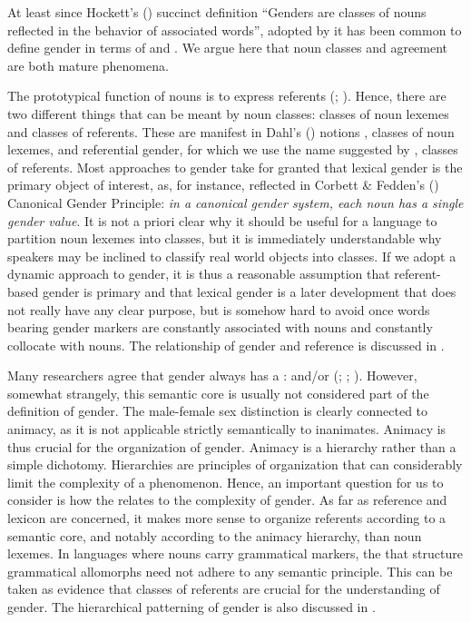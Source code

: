 \documentclass[output=collectionpaper]{langsci/langscibook}
\begin{document}
At least since Hockett's (\citeyear[231]{Hockett1958}) succinct definition \textendash{} ``Genders are classes of nouns reflected in the behavior of associated words'', adopted by \citet{Corbett1991} \textendash{} it has been common to define gender in terms of  and . We argue here that noun classes and agreement are both mature phenomena.

The prototypical function of nouns is to express referents (\citealt[438]{Croft2005}; \citealt{Baker2003}). Hence, there are two different things that can be meant by noun classes: classes of noun lexemes and classes of referents. These are manifest in Dahl's (\citeyear[107]{Dahl2000a}) notions , classes of noun lexemes, and referential gender, for which we use the name  suggested by , classes of referents. Most approaches to gender take for granted that lexical gender is the primary object of interest, as, for instance, reflected in Corbett \& Fedden's (\citeyear[9]{Corbett2016}) Canonical Gender Principle: \emph{in a canonical gender system, each noun has a single gender value}. It is not a priori clear why it should be useful for a language to partition noun lexemes into classes, but it is immediately understandable why speakers may be inclined to classify real world objects into classes. If we adopt a dynamic approach to gender, it is thus a reasonable assumption that referent-based gender is primary and that lexical gender is a later development that does not really have any clear purpose, but is somehow hard to avoid once words bearing gender markers are constantly associated with nouns and constantly collocate with nouns. The relationship of gender and reference is discussed in .

Many researchers agree that gender always has a :  and/or  (\citealt[101]{Dahl2000a}; \citealt[68]{Corbett1991}; \citealt{Luraghi2011}). However, somewhat strangely, this semantic core is usually not considered part of the definition of gender. The male-female sex distinction is clearly connected to animacy, as it is not applicable strictly semantically to inanimates. Animacy is thus crucial for the organization of gender. Animacy is a hierarchy rather than a simple dichotomy. Hierarchies are principles of organization that can considerably limit the complexity of a phenomenon. Hence, an important question for us to consider is how the  relates to the complexity of gender. As far as reference and lexicon are concerned, it makes more sense to organize referents according to a semantic core, and notably according to the animacy hierarchy, than noun lexemes. In languages where nouns carry grammatical markers, the  that structure grammatical allomorphs need not adhere to any semantic principle. This can be taken as evidence that classes of referents are crucial for the understanding of gender. The hierarchical patterning of gender is also discussed in .
\end{document}
